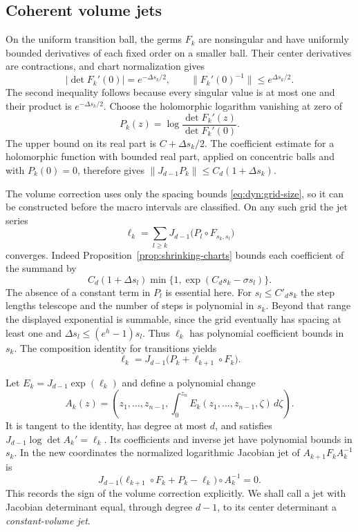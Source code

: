\documentclass[11pt]{article}
\theoremstyle{definition}
\theoremstyle{remark}
\newcommand{\norm}[1]{\lVert#1\rVert}
\newcommand{\abs}[1]{\lvert#1\rvert}
\numberwithin{equation}{section}
\begin{document}
\subsection{Coherent volume jets}

On the uniform transition ball, the germs $F_k$ are nonsingular and have
uniformly bounded derivatives of each fixed order on a smaller ball.
Their center derivatives are contractions, and chart normalization gives
\begin{equation}
 \abs{\det F_k'(0)}=e^{-\Delta s_k/2},\qquad
 \norm{F_k'(0)^{-1}}\le e^{\Delta s_k/2}.
 \label{eq:dyn:transition-linear}
\end{equation}
The second inequality follows because every singular value is at most
one and their product is $e^{-\Delta s_k/2}$.
Choose the holomorphic logarithm vanishing at zero of
\[
 P_k(z)=\log\frac{\det F_k'(z)}{\det F_k'(0)}.
\]
The upper bound on its real part is $C+\Delta s_k/2$.  The coefficient
estimate for a holomorphic function with bounded real part, applied on
concentric balls and with $P_k(0)=0$, therefore gives
$\norm{J_{d-1}P_k}\le C_d(1+\Delta s_k)$.

The volume correction uses only the spacing bounds
\eqref{eq:dyn:grid-size}, so it can be constructed before the macro
intervals are classified.  On any such grid the jet series
\begin{equation}
 \ell_k=\sum_{l\ge k}J_{d-1}
       \bigl(P_l\circ F_{s_k,s_l}\bigr)
 \label{eq:dyn:volume-series}
\end{equation}
converges.  Indeed Proposition~\ref{prop:shrinking-charts} bounds each
coefficient of the summand by
\[
 C_d(1+\Delta s_l)
       \min\{1,\exp(C_d s_k-\sigma s_l)\}.
\]
The absence of a constant term in $P_l$ is essential here.  For
$s_l\le C'_d s_k$ the step lengths telescope and the number of steps is
polynomial in $s_k$.  Beyond that range the displayed exponential is
summable, since the grid eventually has spacing at least one and
$\Delta s_l\le(e^h-1)s_l$.  Thus $\ell_k$ has polynomial coefficient
bounds in $s_k$.  The composition identity for transitions yields
\begin{equation}
 \ell_k=J_{d-1}\bigl(P_k+\ell_{k+1}\circ F_k\bigr).
 \label{eq:dyn:volume-cocycle}
\end{equation}

Let $E_k=J_{d-1}\exp(\ell_k)$ and define a polynomial change
\[
 A_k(z)=\left(z_1,\ldots,z_{n-1},
       \int_0^{z_n}E_k(z_1,\ldots,z_{n-1},\zeta)\,d\zeta\right).
\]
It is tangent to the identity, has degree at most $d$, and satisfies
$J_{d-1}\log\det A_k'=\ell_k$.  Its coefficients and inverse jet have
polynomial bounds in $s_k$.  In the new coordinates the normalized
logarithmic Jacobian jet of $A_{k+1}F_kA_k^{-1}$ is
\[
 J_{d-1}\bigl(\ell_{k+1}\circ F_k+P_k-\ell_k\bigr)\circ A_k^{-1}=0.
\]
This records the sign of the volume correction explicitly.  We shall
call a jet with Jacobian determinant equal, through degree $d-1$, to
its center determinant a \emph{constant-volume jet}.
\end{document}
